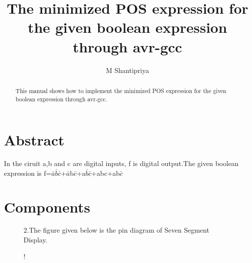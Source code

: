 \documentclass[journal,12pt,twocolumn]{IEEEtran}
\begin{document}
%

\theoremstyle{definition}
\newtheorem{theorem}{Theorem}[section]
\newtheorem{problem}{Problem}
\newtheorem{proposition}{Proposition}[section]
\newtheorem{lemma}{Lemma}[section]
\newtheorem{corollary}[theorem]{Corollary}
\newtheorem{example}{Example}[section]
\newtheorem{definition}{Definition}[section]
\newcommand{\BEQA}{\begin{eqnarray}}
\newcommand{\EEQA}{\end{eqnarray}}
\newcommand{\define}{\stackrel{\triangle}{=}}
\vspace{2cm}
\title{ 
The minimized POS expression for the given boolean expression through avr-gcc
}

\author{M Shantipriya}


\maketitle
\tableofcontents
%
\section{\textbf{Abstract}}

\begin{abstract}
This manual shows how to implement the minimized POS expression for the given boolean expression through avr-gcc.
\end{abstract}

In the ciruit a,b and c are digital inputs, f is digital output.The given boolean expression is f=$\bar{a}$$\bar{b}$$\bar{c}$+$\bar{a}$b$\bar{c}$+a$\bar{b}$$\bar{c}$+abc+ab$\bar{c}$

\section{\textbf{Components}}

\begin{table}[!h]
\centering
\caption{}
\label{table:7447_disp}
\end{table}

\begin{figure}[!h]
2.The figure given below is the pin diagram of Seven Segment Display.\\
\begin{center}
\resizebox {0.4\columnwidth} {!} {

}
\end{center}

\caption{}
\label{fig:sevenseg}
\end{figure}
\end{document}
